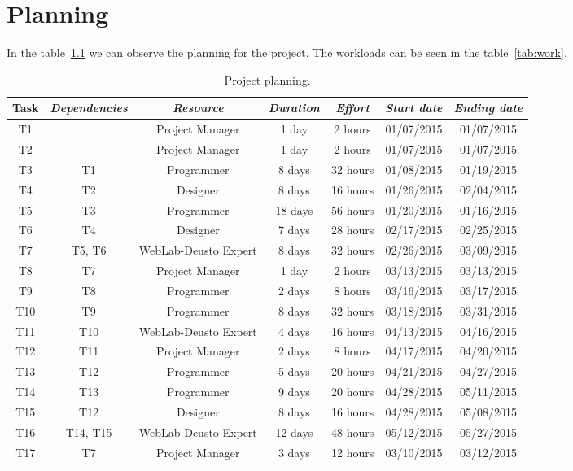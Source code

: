 \chapter{Planning}

In the table~\ref{tab:plan} we can observe the planning for the project. The workloads can be seen
in the table~\ref{tab:work}.

\begin{table}[h]
	\centering
	\caption{Project planning.}\label{tab:plan}
	\begin{tabular}{ccccccc}
		\toprule
		\textbf{Task} & \emph{Dependencies} & \emph{Resource} & \emph{Duration} & \emph{Effort} & \emph{Start date} & \emph{Ending date}\\
		\midrule
		T1	&				& Project Manager		& 1 day		&	2 hours		& 01/07/2015	& 01/07/2015	\\
		T2	&				& Project Manager		& 1 day		&	2 hours		& 01/07/2015	& 01/07/2015	\\
		T3	&	T1			& Programmer			& 8 days	&	32 hours	& 01/08/2015	& 01/19/2015	\\
		T4	&	T2			& Designer				& 8 days	&	16 hours	& 01/26/2015	& 02/04/2015	\\
		T5	&	T3			& Programmer			& 18 days	&	56 hours	& 01/20/2015	& 01/16/2015	\\
		T6	&	T4			& Designer				& 7 days	&	28 hours	& 02/17/2015	& 02/25/2015	\\
		T7	&	T5, T6		& WebLab-Deusto	Expert	& 8 days	&	32 hours	& 02/26/2015	& 03/09/2015	\\
		T8	&	T7			& Project Manager		& 1 day		&	2 hours		& 03/13/2015	& 03/13/2015	\\
		T9	&	T8			& Programmer			& 2 days	&	8 hours		& 03/16/2015	& 03/17/2015	\\
		T10	&	T9			& Programmer			& 8 days	&	32 hours	& 03/18/2015	& 03/31/2015	\\
		T11	&	T10			& WebLab-Deusto	Expert	& 4 days	&	16 hours	& 04/13/2015	& 04/16/2015	\\
		T12	&	T11			& Project Manager		& 2 days	&	8 hours		& 04/17/2015	& 04/20/2015	\\
		T13	&	T12			& Programmer			& 5 days	&	20 hours	& 04/21/2015	& 04/27/2015	\\
		T14	&	T13			& Programmer			& 9 days	&	20 hours	& 04/28/2015	& 05/11/2015	\\
		T15	&	T12			& Designer				& 8 days	&	16 hours	& 04/28/2015	& 05/08/2015	\\
		T16	&	T14, T15	& WebLab-Deusto	Expert	& 12 days	&	48 hours	& 05/12/2015	& 05/27/2015	\\
		T17	&	T7			& Project Manager		& 3 days	&	12 hours	& 03/10/2015	& 03/12/2015	\\
		\bottomrule
	\end{tabular}
\end{table}


